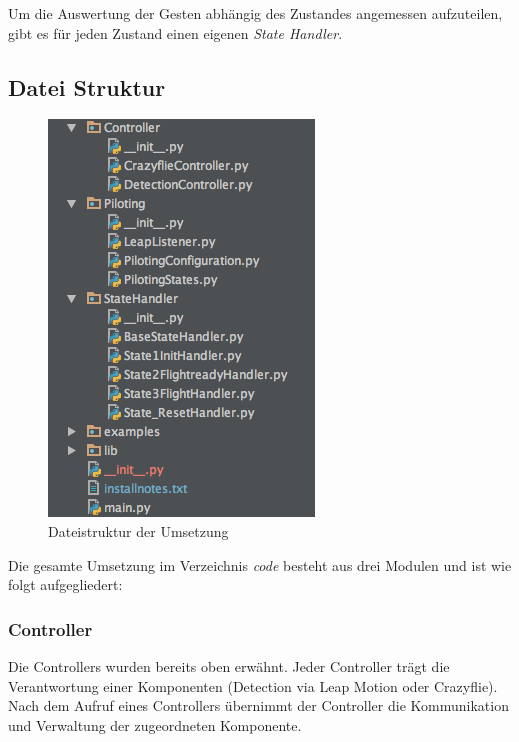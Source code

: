 Um die Auswertung der Gesten abhängig des Zustandes angemessen aufzuteilen, gibt es für jeden Zustand einen eigenen \textit{State Handler}.

\newpage

\subsection{Datei Struktur}
\begin{figure}
	\includegraphics[width=1.0\linewidth]{figures/poc/filestructure.png}
	\caption[Dateistruktur]{Dateistruktur der Umsetzung}
\end{figure}
Die gesamte Umsetzung im Verzeichnis \textit{code} besteht aus drei Modulen und ist wie folgt aufgegliedert:

\subsubsection{Controller}
Die Controllers wurden bereits oben erwähnt. Jeder Controller trägt die Verantwortung einer Komponenten (Detection via Leap Motion oder Crazyflie).
Nach dem Aufruf eines Controllers übernimmt der Controller die Kommunikation und Verwaltung der zugeordneten Komponente.

